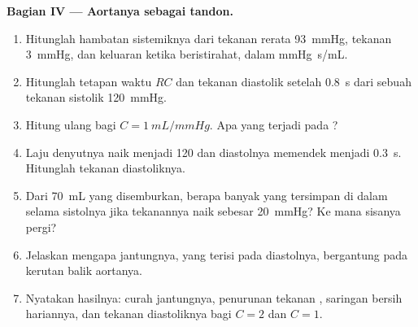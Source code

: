 \begin{problem}
\medskip
\noindent\textbf{Bagian IV --- Aortanya sebagai tandon.}
\begin{enumerate}[resume]
  \item Hitunglah hambatan sistemiknya dari tekanan rerata
        \qty{93}{mmHg}, tekanan  \qty{3}{mmHg}, dan keluaran ketika
        beristirahat, dalam \unit{mmHg.s/mL}.
  \item Hitunglah tetapan waktu $RC$ dan tekanan diastolik setelah
        \qty{0.8}{s} dari sebuah tekanan sistolik \qty{120}{mmHg}.
  \item Hitung ulang bagi $C = \qty{1}{mL/mmHg}$. Apa yang terjadi pada
        ?
  \item Laju denyutnya naik menjadi \num{120} dan diastolnya memendek
        menjadi \qty{0.3}{s}. Hitunglah tekanan diastoliknya.
  \item Dari \qty{70}{mL} yang disemburkan, berapa banyak yang tersimpan
        di dalam  selama sistolnya jika tekanannya naik sebesar
        \qty{20}{mmHg}? Ke mana sisanya pergi?
  \item Jelaskan mengapa  jantungnya, yang terisi pada diastolnya,
        bergantung pada kerutan balik aortanya.
  \item Nyatakan hasilnya: curah jantungnya, penurunan tekanan
        , saringan bersih hariannya, dan tekanan diastoliknya
        bagi $C = 2$ dan $C = 1$.
\end{enumerate}
\end{problem}
